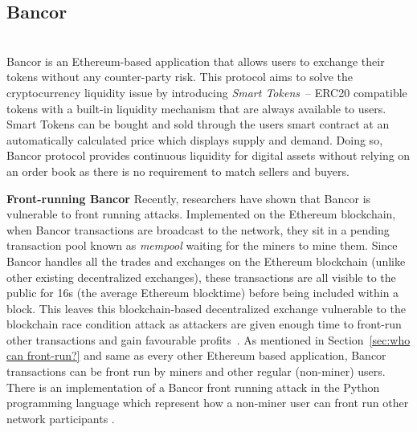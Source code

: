 \subsection{Bancor} \hfill\\
\noindent Bancor is an Ethereum-based application that allows users to exchange their tokens without any counter-party risk. This protocol aims to solve the cryptocurrency liquidity issue by introducing \textit{Smart Tokens}~\cite{hertzog2017bancor}-- ERC20 compatible tokens with a built-in liquidity mechanism that are always available to users. Smart Tokens can be bought and sold through the users smart contract at an automatically calculated price which displays supply and demand. Doing so, Bancor protocol provides continuous liquidity for digital assets without relying on an order book as there is no requirement to match sellers and buyers.

\par\noindent\textbf{Front-running Bancor} Recently, researchers have shown that Bancor is vulnerable to front running attacks. Implemented on the Ethereum blockchain, when Bancor transactions are broadcast to the network, they sit in a pending transaction pool known as \textit{mempool} waiting for the miners to mine them. Since Bancor handles all the trades and exchanges on the Ethereum blockchain (unlike other existing decentralized exchanges), these transactions are all visible to the public for 16s (the average Ethereum blocktime) before being included within a block. This leaves this blockchain-based decentralized exchange vulnerable to the blockchain race condition attack as attackers are given enough time to front-run other transactions and gain favourable profits~\cite{BancorIs7:online}. As mentioned in Section~\ref{sec:who can front-run?} and same as every other Ethereum based application, Bancor transactions can be front run by miners and other regular (non-miner) users. There is an implementation of a Bancor front running attack in the Python programming language which represent how a non-miner user can front run other network participants \cite{NewTab13:online}.




